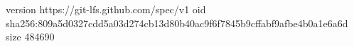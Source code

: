 version https://git-lfs.github.com/spec/v1
oid sha256:809a5d0327cdd5a03d274cb13d80b40ac9f6f7845b9cffabf9afbe4b0a1e6a6d
size 484690
